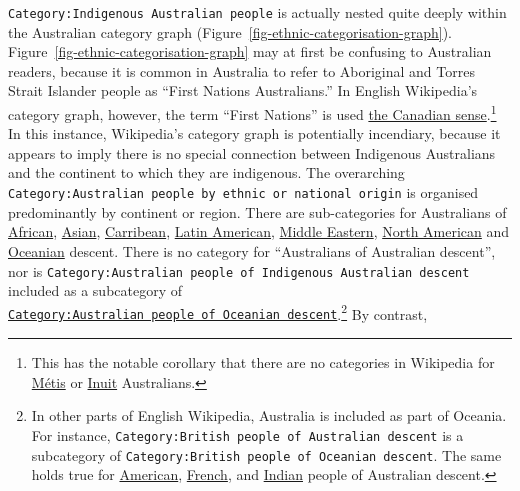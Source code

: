 \documentclass[
  a4paper,
  DIV=11,
  numbers=noendperiod]{scrreprt}
\begin{document}
\texttt{Category:Indigenous\ Australian\ people} is actually nested
quite deeply within the Australian category graph
(Figure~\ref{fig-ethnic-categorisation-graph}).
Figure~\ref{fig-ethnic-categorisation-graph} may at first be confusing
to Australian readers, because it is common in Australia to refer to
Aboriginal and Torres Strait Islander people as ``First Nations
Australians.'' In English Wikipedia's category graph, however, the term
``First Nations'' is used
\href{https://en.wikipedia.org/wiki/First_Nations_in_Canada}{the
Canadian sense}.\footnote{This has the notable corollary that there are
  no categories in Wikipedia for
  \href{https://en.wikipedia.org/wiki/M\%C3\%A9tis}{Métis} or
  \href{https://en.wikipedia.org/wiki/Inuit}{Inuit} Australians.} In
this instance, Wikipedia's category graph is potentially incendiary,
because it appears to imply there is no special connection between
Indigenous Australians and the continent to which they are indigenous.
The overarching
\texttt{Category:Australian\ people\ by\ ethnic\ or\ national\ origin}
is organised predominantly by continent or region. There are
sub-categories for Australians of
\href{https://en.wikipedia.org/wiki/Category:Australian_people_of_African_descent}{African},
\href{https://en.wikipedia.org/wiki/Category:Australian_people_of_Asian_descent}{Asian},
\href{https://en.wikipedia.org/wiki/Category:Australian_people_of_Caribbean_descent}{Carribean},
\href{https://en.wikipedia.org/wiki/Category:Australian_people_of_Latin_American_descent}{Latin
American},
\href{https://en.wikipedia.org/wiki/Category:Australian_people_of_Middle_Eastern_descent}{Middle
Eastern},
\href{https://en.wikipedia.org/wiki/Category:Australian_people_of_North_American_descent}{North
American} and
\href{https://en.wikipedia.org/wiki/Category:Australian_people_of_Oceanian_descent}{Oceanian}
descent. There is no category for ``Australians of Australian descent'',
nor is
\texttt{Category:Australian\ people\ of\ Indigenous\ Australian\ descent}
included as a subcategory of
\href{https://en.wikipedia.org/w/index.php?title=Category:Australian_people_of_Oceanian_descent\&oldid=607565632}{\texttt{Category:Australian\ people\ of\ Oceanian\ descent}}.\footnote{In
  other parts of English Wikipedia, Australia is included as part of
  Oceania. For instance,
  \texttt{Category:British\ people\ of\ Australian\ descent} is a
  subcategory of
  \texttt{Category:British\ people\ of\ Oceanian\ descent}. The same
  holds true for
  \href{https://en.wikipedia.org/wiki/Category:American_people_of_Oceanian_descent}{American},
  \href{https://en.wikipedia.org/wiki/Category:French_people_of_Oceanian_descent}{French},
  and
  \href{https://en.wikipedia.org/wiki/Category:Indian_people_of_Oceanian_descent}{Indian}
  people of Australian descent.} By contrast,
\end{document}

